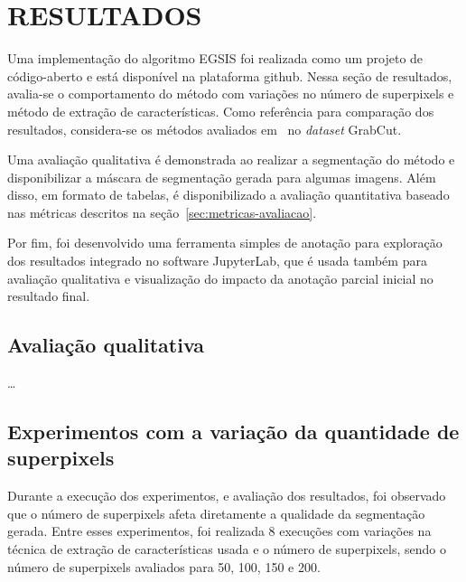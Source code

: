 \chapter{RESULTADOS}\label{chap:resultados}

Uma implementação do algoritmo EGSIS foi realizada como um projeto de
código-aberto e está disponível na plataforma
github\footnotemark. Nessa seção de resultados, avalia-se o
comportamento do método com variações no número de superpixels e
método de extração de características. Como referência para comparação
dos resultados, considera-se os métodos avaliados
em~\cite{wang2023review} no \textit{dataset} GrabCut.


Uma avaliação qualitativa é demonstrada ao realizar a segmentação do
método e disponibilizar a máscara de segmentação gerada para algumas
imagens. Além disso, em formato de tabelas, é disponibilizado a
avaliação quantitativa baseado nas métricas descritos na
seção~\ref{sec:metricas-avaliacao}.

Por fim, foi desenvolvido uma ferramenta simples de anotação para
exploração dos resultados integrado no software
JupyterLab\footnotemark, que é usada também para avaliação qualitativa
e visualização do impacto da anotação parcial inicial no resultado
final.


\section{Avaliação qualitativa}

\ldots

\section{Experimentos com a variação da quantidade de superpixels}\label{sec:variacao-superpixels}

Durante a execução dos experimentos, e avaliação dos resultados, foi
observado que o número de superpixels afeta diretamente a qualidade da
segmentação gerada. Entre esses experimentos, foi realizada 8
execuções com variações na técnica de extração de características
usada e o número de superpixels, sendo o número de superpixels
avaliados para 50, 100, 150 e 200.

